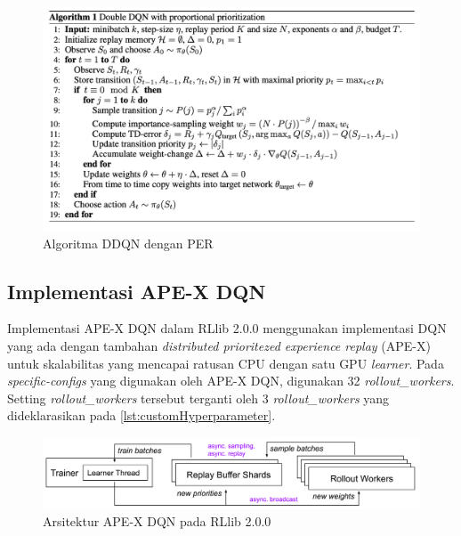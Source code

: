 \begin{figure}[H]
  \centering
    \includegraphics[scale=0.47]{gambar/ddqn_per_algorithm.png}
    \caption{Algoritma DDQN dengan PER}
    \label{fig:ddqnPer}
\end{figure}


\subsection{Implementasi APE-X DQN}
Implementasi APE-X DQN dalam RLlib 2.0.0 menggunakan implementasi DQN yang ada dengan
tambahan \emph{distributed prioritezed experience replay} (APE-X) untuk skalabilitas
yang mencapai ratusan CPU dengan satu GPU \emph{learner}. Pada \emph{specific-configs}
yang digunakan oleh APE-X DQN, digunakan 32 \emph{rollout\_workers}. Setting \emph{rollout\_workers}
tersebut terganti oleh 3 \emph{rollout\_workers} yang dideklarasikan pada \ref{lst:customHyperparameter}.

\begin{figure}[H]
  \centering
    \includegraphics[scale=0.56]{gambar/rllib_apex-dqn_architecture.png}
    \caption{Arsitektur APE-X DQN pada RLlib 2.0.0 \citep{rllibDocumentation}}
    \label{fig:rllib_apex-dqn_architecture}
\end{figure}

